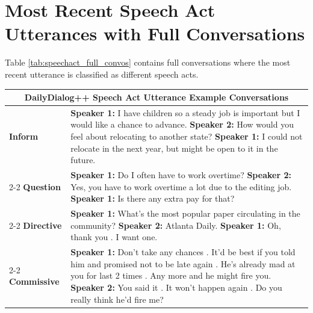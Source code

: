 \documentclass[11pt]{article}
\begin{document}


\clearpage
\pagebreak
\appendix

\section{Most Recent Speech Act Utterances with Full Conversations}\label{app:speechact_convos}

Table \ref{tab:speechact_full_convos} contains full conversations where the most recent utterance is classified as different speech acts.

\begin{table}[ht!]
\small
    \centering
    \begin{tabular}{|p{3cm}|p{11.5cm}|}
     \multicolumn{2}{c}{\textbf{DailyDialog++ Speech Act Utterance Example Conversations}} \\\hline
     \rule{0pt}{1em}
     \textbf{Inform} & \textbf{Speaker 1:} I have children so a steady job is important but I would like a chance to advance.\newline 
\hspace*{0.5cm} \textbf{Speaker 2:} How would you feel about relocating to another state?\newline 
\textbf{Speaker 1:} I could not relocate in the next year, but might be open to it in the future.\\\cline{2-2}
     \textbf{Question} & \textbf{Speaker 1:} Do I often have to work overtime?\newline 
\hspace*{0.5cm} \textbf{Speaker 2:} Yes, you have to work overtime a lot due to the editing job.\newline 
\textbf{Speaker 1:} Is there any extra pay for that? \\\cline{2-2}
     \textbf{Directive} & \textbf{Speaker 1:} What's the most popular paper circulating in the community?\newline 
\hspace*{0.5cm} \textbf{Speaker 2:} Atlanta Daily.\newline 
\textbf{Speaker 1:} Oh, thank you . I want one.\\\cline{2-2}
     \textbf{Commissive} & \textbf{Speaker 1:} Don't take any chances . It'd be best if you told him and promised not to be late again . He's already mad at you for last 2 times . Any more and he might fire you.\newline 
\hspace*{0.5cm} \textbf{Speaker 2:} You said it . It won't happen again . Do you really think he'd fire me?\newline 

\end{tabular}
\end{table}
\end{document}
